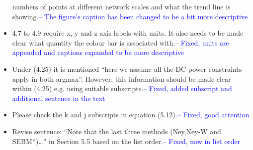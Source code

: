 \documentclass{article}
\begin{document}
\begin{itemize}
numbers of points at different network scales and what the trend line is
showing.\textcolor{blue}{-- The figure's caption has been changed to be a bit more descriptive}
\item	4.7 to 4.9 require x, y and z axis labels with units. It also needs to be made
clear what quantity the colour bar is associated with.\textcolor{blue}{-- Fixed, units are appended and captions expanded to be more descriptive}
\item	Under (4.25) it is mentioned “here we assume all the DC power constraints
apply in both argmax”. However, this information should be made clear within
(4.25) e.g. using suitable subscripts.\textcolor{blue}{-- Fixed, added subscript and additional sentence in the text}
\item	Please check the k and j subscripts in equation (5.12).\textcolor{blue}{-- Fixed, good attention}
\item	Revise sentence: “Note that the last three methods (Ney,Ney-W and
SEBM*)…” in Section 5.5 based on the list order.\textcolor{blue}{-- Fixed, now in list order}
\end{itemize}
\end{document}
